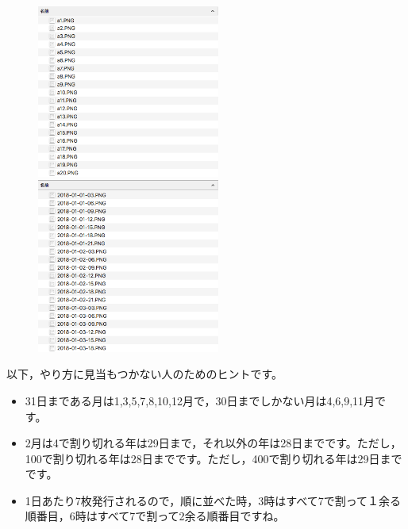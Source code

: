 \documentclass[a4j]{ltjreport}
\begin{document}
    \begin{figure}[h]
        \begin{minipage}{0.5\hsize}
            \begin{center}
                \includegraphics[width=60mm]{before.PNG}
            \end{center}
        \end{minipage}
        \begin{minipage}{0.5\hsize}
            \begin{center}
                \includegraphics[width=60mm]{after.PNG}
            \end{center}
        \end{minipage}
    \end{figure}


    以下，やり方に見当もつかない人のためのヒントです。

    \begin{itemize}
        \item 31日まである月は1,3,5,7,8,10,12月で，30日までしかない月は4,6,9,11月です。
        \item 2月は4で割り切れる年は29日まで，それ以外の年は28日までです。ただし，100で割り切れる年は28日までです。ただし，400で割り切れる年は29日までです。
        \item 1日あたり7枚発行されるので，順に並べた時，3時はすべて7で割って１余る順番目，6時はすべて7で割って2余る順番目ですね。
    \end{itemize}
\end{document}
